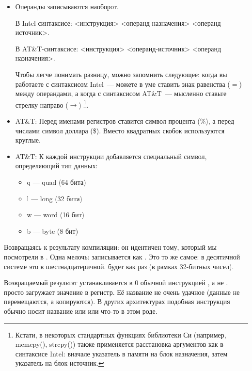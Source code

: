 \begin{itemize}

\item
Операнды записываются наоборот.

В Intel-синтаксисе: <инструкция> <операнд назначения> <операнд-источник>.

В AT\&T-синтаксисе: <инструкция> <операнд-источник> <операнд назначения>.

Чтобы легче понимать разницу, можно запомнить следующее:
когда вы работаете с синтаксисом Intel~--- можете в уме ставить знак равенства ($=$) между операндами,
а когда с синтаксисом AT\&T~--- мысленно ставьте стрелку направо ($\rightarrow$)
\footnote{Кстати, в некоторых стандартных функциях библиотеки Си (например, memcpy(), strcpy()) также применяется 
расстановка аргументов как в синтаксисе Intel: вначале указатель в памяти на блок назначения, 
затем указатель на блок-источник.}.

\item
AT\&T: Перед именами регистров ставится символ процента (\%), а перед числами символ доллара (\$).
Вместо квадратных скобок используются круглые.

\item
AT\&T: К каждой инструкции добавляется специальный символ, определяющий тип данных:

\begin{itemize}
\item q --- quad (64 бита)
\item l --- long (32 бита)
\item w --- word (16 бит)
\item b --- byte (8 бит)
\end{itemize}


\end{itemize}

Возвращаясь к результату компиляции: он идентичен тому, который мы посмотрели в \IDA.
Одна мелочь:  записывается как .
Это то же самое:  в десятичной системе это  в шестнадцатеричной.
 будет как раз  (в рамках 32-битных чисел).

Возвращаемый результат устанавливается в 0 обычной инструкцией \MOV, а не \XOR.
\MOV просто загружает значение в регистр.
Её название не очень удачное (данные не перемещаются, а копируются). В других архитектурах подобная инструкция обычно носит название  или  или что-то в этом роде.

